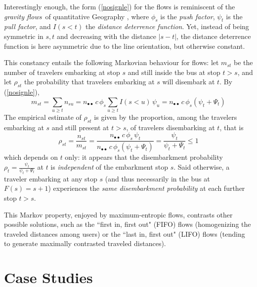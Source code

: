 \documentclass{bmcart}
\begin{document}
Interestingly enough, the form (\ref{nosignle}) for the flows is reminiscent of the {\em gravity flows} of quantitative Geography \cite{wilson1967statistical}  \cite{erlander1990gravity} \cite{bavaud2002quasi} \cite{Thomas-Agnan2021}, where 
$\phi_s$ is the {\em push factor}, $\psi_t$ is the {\em pull factor}, and $I(s<t)$ the {\em distance deterrence function}. Yet, instead of  
being symmetric in $s,t$ and decreasing with the distance $|s-t|$, the distance deterrence function is here asymmetric due to the line orientation, but otherwise constant. 

This constancy entails the following Markovian behaviour for flows: let $m_{st}$ be the number of travelers embarking at stop $s$ and still inside the bus at stop $t>s$, and let $\rho_{st}$ the probability that travelers embarking at $s$ will disembark at $t$. By (\ref{nosignle}), 
\begin{displaymath}
m_{st}=\sum_{u\ge t}n_{su}=n_{\bullet\bullet}\, c\, \phi_s  \sum_{u\ge t} I(s<u)\, \psi_u =n_{\bullet\bullet}\, c\,  \phi_s (\psi_t+\Psi_t) 
\end{displaymath}
The empirical estimate of $\rho_{st}$ is given by the proportion, among the travelers embarking at $s$ and 
 still present at $t>s$,  of travelers disembarking at $t$, that is 
\begin{displaymath}
\rho_{st}=\frac{n_{st}}{m_{st}}=\frac{n_{\bullet\bullet}\, c\,  \phi_s\,   \psi_t}{n_{\bullet\bullet}\, c\,  \phi_s (\psi_t+\Psi_t)}=\frac{\psi_t}{\psi_t+\Psi_t}\le 1 
\end{displaymath}
which depends on $t$ only: it appears that the disembarkment probability $\rho_t=\frac{\psi_t}{\psi_t+\Psi_t}$ at $t$ is {\em independent} of the embarkment stop $s$. Said otherwise, a traveler embarking at any stop $s$ (and thus necessarily in the bus at $F(s)=s+1$) experiences the {\em same disembarkment probability} at each further stop $t>s$. 


This Markov property, enjoyed by maximum-entropic flows, contrasts other possible solutions, such as  the ``first in, first out" (FIFO) flows (homogenizing the 
traveled distances among users) or the ``last in, first out" (LIFO) flows (tending to generate maximally  contrasted traveled distances).

 

\section{Case Studies}
\label{casestudies}
\end{document}
